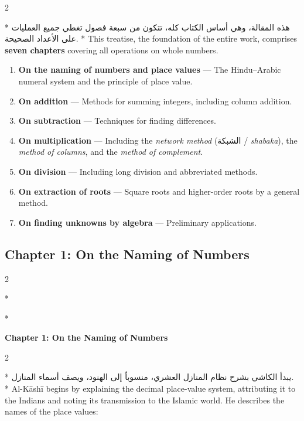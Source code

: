\documentclass[11pt,a4paper]{article}
\newcommand{\ar}[1]{{\arabicfont\beginR #1\endR}}
\newenvironment{bilingual}{%
  \vspace{0.3em}%
  \begin{paracol}{2}%
}{%
  \end{paracol}%
  \vspace{0.3em}%
}
\begin{document}
\begin{bilingual}
\switchcolumn[0]*
\ar{هذه المقالة، وهي أساس الكتاب كله، تتكون من سبعة فصول تغطي جميع العمليات على الأعداد الصحيحة.}
\switchcolumn[1]*
This treatise, the foundation of the entire work, comprises
\textbf{seven chapters} covering all operations on whole numbers.
\end{bilingual}

\begin{enumerate}[label=\textbf{Ch.\arabic*:}]
  \item \textbf{On the naming of numbers and place values} --- The
  Hindu--Arabic numeral system and the principle of place value.
  \item \textbf{On addition} --- Methods for summing integers, including
  column addition.
  \item \textbf{On subtraction} --- Techniques for finding differences.
  \item \textbf{On multiplication} --- Including the \textit{network
  method} (\ar{الشبكة} / \textit{shabaka}), the \textit{method of
  columns}, and the \textit{method of complement}.
  \item \textbf{On division} --- Including long division and abbreviated
  methods.
  \item \textbf{On extraction of roots} --- Square roots and higher-order
  roots by a general method.
  \item \textbf{On finding unknowns by algebra} --- Preliminary
  applications.
\end{enumerate}

\subsection{Chapter 1: On the Naming of Numbers}

\begin{bilingual}
\switchcolumn[0]*
\begin{center}
\textbf{\color{chapcolor}\ar{فصل في التعريف بالأعداد وأسمائها ومنازلها}}
\end{center}
\switchcolumn[1]*
\begin{center}
\textbf{\color{chapcolor}Chapter 1: On the Naming of Numbers}
\end{center}
\end{bilingual}

\begin{bilingual}
\switchcolumn[0]*
\ar{يبدأ الكاشي بشرح نظام المنازل العشري، منسوباً إلى الهنود، ويصف أسماء المنازل.}
\switchcolumn[1]*
Al-K\=ash\=i begins by explaining the decimal place-value system, attributing
it to the Indians and noting its transmission to the Islamic world. He
describes the names of the place values:
\end{bilingual}
\end{document}
